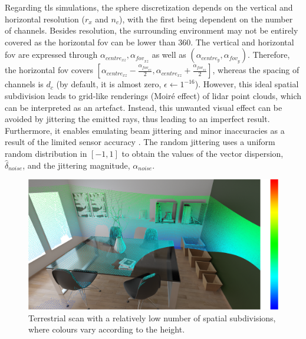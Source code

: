 Regarding \acrshort{tls} simulations, the sphere discretization depends on the vertical and horizontal resolution ($r_x$ and $n_c$), with the first being dependent on the number of channels. Besides resolution, the surrounding environment may not be entirely covered as the horizontal \acrshort{fov} can be lower than 360\textdegree. The vertical and horizontal \acrshort{fov} are expressed through $\alpha_{\textit{centre}_{xz}}, \alpha_{\textit{fov}_{xz}}$ as well as $(\alpha_{\textit{centre}_{y}}, \alpha_{\textit{fov}_{y}})$. Therefore, the horizontal \acrshort{fov} covers $[\alpha_{\textit{centre}_{xz}} - \frac{\alpha_{\textit{fov}_{xz}}}{2}, \alpha_{\textit{centre}_{xz}} + \frac{\alpha_{\textit{fov}_{xz}}}{2}]$, whereas the spacing of channels is $d_c$ (by default, it is almost zero, $\epsilon \gets 1^{-16}$). However, this ideal spatial subdivision leads to grid-like renderings (Moiré effect) of \acrshort{lidar} point clouds, which can be interpreted as an artefact. Instead, this unwanted visual effect can be avoided by jittering \cite{akenine-moller_real-time_2018} the emitted rays, thus leading to an imperfect result. Furthermore, it enables emulating beam jittering and minor inaccuracies as a result of the limited sensor accuracy \cite{mcmanamon_lidar_2019}. The random jittering uses a uniform random distribution in $[-1, 1]$ to obtain the values of the vector dispersion, $\hat{\delta}_{\textit{noise}}$, and the jittering magnitude, $\alpha_{\textit{noise}}$.

\begin{figure}[ht]
	\centering
	\includegraphics[width=\linewidth]{figs/lidar_simulation/tls_first_approach.png}
	\caption{Terrestrial scan with a relatively low number of spatial subdivisions, where colours vary according to the height.}
	\label{fig:tls_first_approach}
\end{figure}

